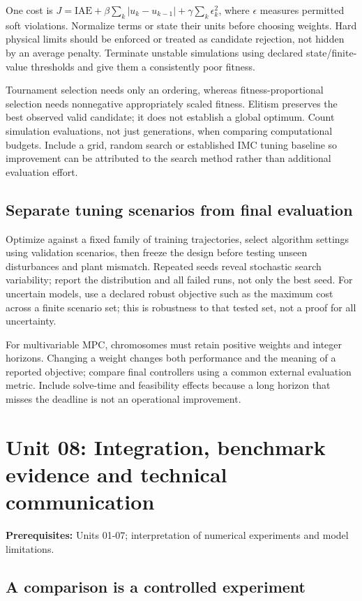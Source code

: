 \documentclass[11pt,a4paper]{article}
\begin{document}
One cost is $J=\mathrm{IAE}+\beta\sum_k|u_k-u_{k-1}|+\gamma\sum_k\epsilon_k^2$, where $\epsilon$ measures permitted soft violations. Normalize terms or state their units before choosing weights. Hard physical limits should be enforced or treated as candidate rejection, not hidden by an average penalty. Terminate unstable simulations using declared state/finite-value thresholds and give them a consistently poor fitness.


Tournament selection needs only an ordering, whereas fitness-proportional selection needs nonnegative appropriately scaled fitness. Elitism preserves the best observed valid candidate; it does not establish a global optimum. Count simulation evaluations, not just generations, when comparing computational budgets. Include a grid, random search or established IMC tuning baseline so improvement can be attributed to the search method rather than additional evaluation effort.


\subsection{Separate tuning scenarios from final evaluation}

Optimize against a fixed family of training trajectories, select algorithm settings using validation scenarios, then freeze the design before testing unseen disturbances and plant mismatch. Repeated seeds reveal stochastic search variability; report the distribution and all failed runs, not only the best seed. For uncertain models, use a declared robust objective such as the maximum cost across a finite scenario set; this is robustness to that tested set, not a proof for all uncertainty.


For multivariable MPC, chromosomes must retain positive weights and integer horizons. Changing a weight changes both performance and the meaning of a reported objective; compare final controllers using a common external evaluation metric. Include solve-time and feasibility effects because a long horizon that misses the deadline is not an operational improvement.

\clearpage\section{Unit 08: Integration, benchmark evidence and technical communication}
\textbf{Prerequisites:} Units 01-07; interpretation of numerical experiments and model limitations.

\subsection{A comparison is a controlled experiment}
\end{document}
